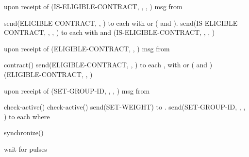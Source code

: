 \documentclass{acm_proc_article-sp}
\begin{document}
\begin{algorithm}                      \caption{upon receipt of (IS-ELIGIBLE-CONTRACT, , , ) msg from }   \label{alg13}                           \begin{algorithmic}
\STATE{}
\STATE send(ELIGIBLE-CONTRACT, , ) to each  with  or ( and ). 
\ELSE
\STATE send(IS-ELIGIBLE-CONTRACT, , , ) to each  with  and 
\ENDIF
\STATE  (IS-ELIGIBLE-CONTRACT, , , )
\ENDIF
\end{algorithmic}
\end{algorithm}

\begin{algorithm}                      \caption{upon receipt of (ELIGIBLE-CONTRACT, , ) msg from }   \label{alg14}                           \begin{algorithmic}
\IF{}
\STATE 
\STATE contract()
\ELSE
\STATE send(ELIGIBLE-CONTRACT, , ) to each ,  with  or ( and )
\ENDIF
\STATE  (ELIGIBLE-CONTRACT, , )
\ENDIF
\end{algorithmic}
\end{algorithm}


\begin{algorithm}                      \caption{upon receipt of (SET-GROUP-ID, , , ) msg from }   \label{alg16}                           \begin{algorithmic}
\STATE{}
\IF{}
\STATE 
\STATE check-active()
\STATE 
\IF{}
\STATE 
\STATE check-active()
\STATE send(SET-WEIGHT) to . 
\ENDIF
\ENDFOR
\ENDIF
\STATE send(SET-GROUP-ID, , , ) to each  where 
\ENDIF
\end{algorithmic}
\end{algorithm}

\begin{algorithm}                      \caption{synchronize()}   \label{alg17}                           \begin{algorithmic}
\STATE{}
\STATE wait for  pulses
\end{algorithmic}
\end{algorithm}

\newpage
\end{document}
